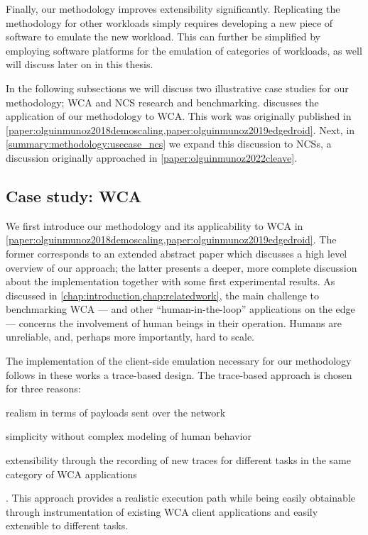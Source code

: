 Finally, our methodology improves extensibility significantly.
Replicating the methodology for other workloads simply requires developing a new piece of software to emulate the new workload.
This can further be simplified by employing software platforms for the emulation of categories of workloads, as well will discuss later on in this thesis.

\medskip
In the following subsections we will discuss two illustrative case studies for our methodology; \acl{WCA} and \acl{NCS} research and benchmarking.
 discusses the application of our methodology to \gls{WCA}.
This work was originally published in \cref{paper:olguinmunoz2018demoscaling,paper:olguinmunoz2019edgedroid}.
Next, in \cref{summary:methodology:usecase_ncs} we expand this discussion to \glspl{NCS}, a discussion originally approached in \cref{paper:olguinmunoz2022cleave}.

\subsection{Case study: \acl{WCA}}\label{summary:methodology:usecase_wca}

We first introduce our methodology and its applicability to \gls{WCA} in \cref{paper:olguinmunoz2018demoscaling,paper:olguinmunoz2019edgedroid}.
The former corresponds to an extended abstract paper which discusses a high level overview of our approach;
the latter presents a deeper, more complete discussion about the implementation together with some first experimental results.
As discussed in \cref{chap:introduction,chap:relatedwork}, the main challenge to benchmarking \gls{WCA} --- and other ``human-in-the-loop'' applications on the edge --- concerns the involvement of human beings in their operation.
Humans are unreliable, and, perhaps more importantly, hard to scale.

The implementation of the client-side emulation necessary for our methodology follows in these works a trace-based design.
The trace-based approach is chosen for three reasons:
\begin{inlineenum}
    \item realism in terms of payloads sent over the network
    \item simplicity without complex modeling of human behavior
    \item extensibility through the recording of new traces for different tasks in the same category of WCA applications
\end{inlineenum}.
This approach provides a realistic execution path while being easily obtainable through instrumentation of existing WCA client applications and easily extensible to different tasks.

